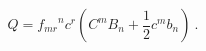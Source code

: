 \begin{equation}
Q = {f_{mr}}^{n} c^{r} (C^{m} B_{n} + \frac{1}{2}c^{m} b_{n})~. \label{eq:botuzyedi} 
\end{equation}

